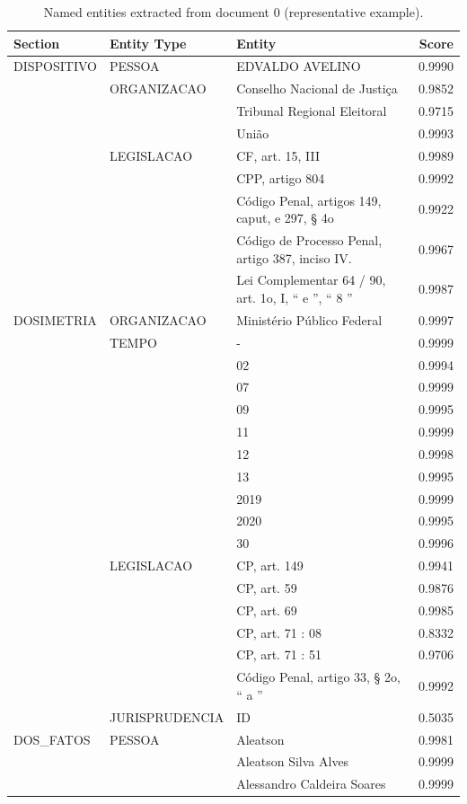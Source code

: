 \begin{table}
\caption{Named entities extracted from document 0 (representative example).}
\label{tab:ner_doc0}
\begin{tabular}{llp{6cm}r}
\toprule
Section & Entity Type & Entity & Score \\
\midrule
DISPOSITIVO & PESSOA & EDVALDO AVELINO & 0.9990 \\
 & ORGANIZACAO & Conselho Nacional de Justiça & 0.9852 \\
 &  & Tribunal Regional Eleitoral & 0.9715 \\
 &  & União & 0.9993 \\
 & LEGISLACAO & CF, art. 15, III & 0.9989 \\
 &  & CPP, artigo 804 & 0.9992 \\
 &  & Código Penal, artigos 149, caput, e 297, § 4o & 0.9922 \\
 &  & Código de Processo Penal, artigo 387, inciso IV. & 0.9967 \\
 &  & Lei Complementar 64 / 90, art. 1o, I, “ e ”, “ 8 ” & 0.9987 \\
DOSIMETRIA & ORGANIZACAO & Ministério Público Federal & 0.9997 \\
 & TEMPO & - & 0.9999 \\
 &  & 02 & 0.9994 \\
 &  & 07 & 0.9999 \\
 &  & 09 & 0.9995 \\
 &  & 11 & 0.9999 \\
 &  & 12 & 0.9998 \\
 &  & 13 & 0.9995 \\
 &  & 2019 & 0.9999 \\
 &  & 2020 & 0.9995 \\
 &  & 30 & 0.9996 \\
 & LEGISLACAO & CP, art. 149 & 0.9941 \\
 &  & CP, art. 59 & 0.9876 \\
 &  & CP, art. 69 & 0.9985 \\
 &  & CP, art. 71 : 08 & 0.8332 \\
 &  & CP, art. 71 : 51 & 0.9706 \\
 &  & Código Penal, artigo 33, § 2o, “ a ” & 0.9992 \\
 & JURISPRUDENCIA & ID & 0.5035 \\
DOS_FATOS & PESSOA & Aleatson & 0.9981 \\
 &  & Aleatson Silva Alves & 0.9999 \\
 &  & Alessandro Caldeira Soares & 0.9999 \\

\end{tabular}
\end{table}
